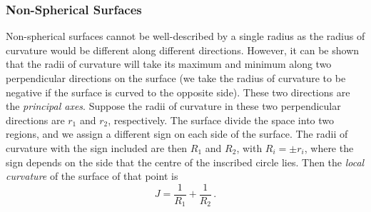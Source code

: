 \documentclass{article}
\theoremstyle{plain}\theoremheaderfont{\normalfont\itshape}\theorembodyfont{\rmfamily}\theoremseparator{.}\newtheorem*{rem}{Remark}\newtheorem*{ex}{Example}\newtheorem*{proof}{Proof}\newtheorem*{altp}{Alternative proof}
\theoremstyle{plain}\theoremheaderfont{\normalfont\bfseries}\theorembodyfont{\rmfamily}\theoremseparator{.}\newtheorem{thm}{Theorem}[section]\newtheorem{lem}[thm]{Lemma}\newtheorem{prop}[thm]{Proposition}\newtheorem*{cor}{Corollary}\newtheorem{defn}[thm]{Definition}\newtheorem{clm}[thm]{Claim}\newtheorem{clminproof}{Claim}\newtheorem*{law}{Law}\newtheorem{pos}[thm]{Postulate}
\theoremstyle{break}\theoremheaderfont{\normalfont\itshape}\theorembodyfont{\rmfamily}\theoremseparator{.\medskip}\newtheorem*{proofskip}{Proof}\newtheorem*{exs}{Examples}\newtheorem*{rems}{Remarks}
\theoremstyle{break}\theoremheaderfont{\normalfont\bfseries}\theorembodyfont{\rmfamily}\theoremseparator{.\medskip}\newtheorem{lemskip}[thm]{Lemma}\newtheorem{defnskip}[thm]{Definition}\newtheorem{propskip}[thm]{Proposition}\newtheorem{thmskip}[thm]{Theorem}
\numberwithin{equation}{section}
\begin{document}
	\subsubsection{Non-Spherical Surfaces}
	Non-spherical surfaces cannot be well-described by a single radius as the radius of curvature would be different along different directions. However, it can be shown that the radii of curvature will take its maximum and minimum along two perpendicular directions on the surface (we take the radius of curvature to be negative if the surface is curved to the opposite side). These two directions are the \textit{principal axes}. Suppose the radii of curvature in these two perpendicular directions are \(r_1\) and \(r_2\), respectively. The surface divide the space into two regions, and we assign a different sign on each side of the surface. The radii of curvature with the sign included are then \(R_1\) and \(R_2\), with \(R_i=\pm r_i\), where the sign depends on the side that the centre of the inscribed circle lies. Then the \textit{local curvature} of the surface of that point is
	\begin{equation}
		J=\frac{1}{R_1}+\frac{1}{R_2}\,.
	\end{equation}
\end{document}

